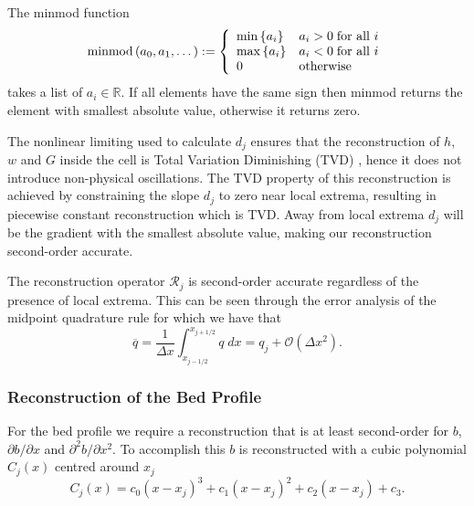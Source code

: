 \begin{defn}
The minmod function
\begin{equation*}
\text{minmod}\left(a_0,a_1,\dots\right) := \left\lbrace \begin{array}{l l}
\min\left\lbrace a_i\right\rbrace & a_i > 0 \; \text{for all } i \\
\max\left\lbrace a_i\right\rbrace & a_i < 0  \; \text{for all } i \\
0 & \text{otherwise}\\
\end{array} \right.
\end{equation*}
takes a list of $a_i \in \mathbb{R}$. If all elements have the same sign then minmod returns the element with smallest absolute value, otherwise it returns zero. 
\end{defn}
The nonlinear limiting used to calculate $d_j$ ensures that the reconstruction of $h$, $w$ and $G$ inside the cell is Total Variation Diminishing (TVD) \cite{Harten-1983-357}, hence it does not introduce non-physical oscillations. The TVD property of this reconstruction is achieved by constraining the slope $d_j$ to zero near local extrema, resulting in piecewise constant reconstruction which is TVD. Away from local extrema $d_j$ will be the gradient with the smallest absolute value, making our reconstruction second-order accurate.

The reconstruction operator $\mathcal{R}_{j} $ is second-order accurate regardless of the presence of local extrema. This can be seen through the error analysis of the midpoint quadrature rule \cite{Davis-Rabinowitz-1984} for which we have that
\begin{equation}
\overline{q} = \frac{1}{\Delta x} \int_{x_{j-1/2}}^{x_{j+1/2}} q \; dx = q_j + \mathcal{O}\left(\Delta x^2\right).
\end{equation}

\subsubsection{Reconstruction of the Bed Profile}
For the bed profile we require a reconstruction that is at least second-order for $b$, $\partial b / \partial x$ and $\partial^2 b / \partial x^2$. To accomplish this $b$ is reconstructed with a cubic polynomial $C_j(x)$ centred around $x_j$
\begin{equation}
C_j(x) = c_0 \left(x - x_j\right)^3 + c_1 \left(x - x_j\right)^2 + c_2 \left(x - x_j\right) + c_3.
\label{eqn:cubicforbedrecon}
\end{equation}

